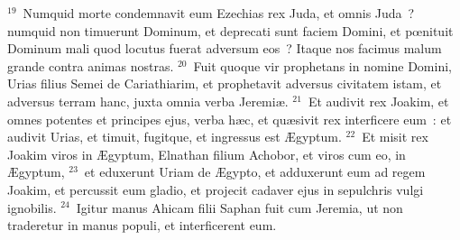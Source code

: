 ${}^{19}$~Numquid morte condemnavit eum Ezechias rex Juda, et omnis Juda~? numquid non timuerunt Dominum, et deprecati sunt faciem Domini, et pœnituit Dominum mali quod locutus fuerat adversum eos~? Itaque nos facimus malum grande contra animas nostras.
${}^{20}$~Fuit quoque vir prophetans in nomine Domini, Urias filius Semei de Cariathiarim, et prophetavit adversus civitatem istam, et adversus terram hanc, juxta omnia verba Jeremi\ae .
${}^{21}$~Et audivit rex Joakim, et omnes potentes et principes ejus, verba h\ae c, et qu\ae sivit rex interficere eum~: et audivit Urias, et timuit, fugitque, et ingressus est \AE gyptum.
${}^{22}$~Et misit rex Joakim viros in \AE gyptum, Elnathan filium Achobor, et viros cum eo, in \AE gyptum,
${}^{23}$~et eduxerunt Uriam de \AE gypto, et adduxerunt eum ad regem Joakim, et percussit eum gladio, et projecit cadaver ejus in sepulchris vulgi ignobilis.
${}^{24}$~Igitur manus Ahicam filii Saphan fuit cum Jeremia, ut non traderetur in manus populi, et interficerent eum.

